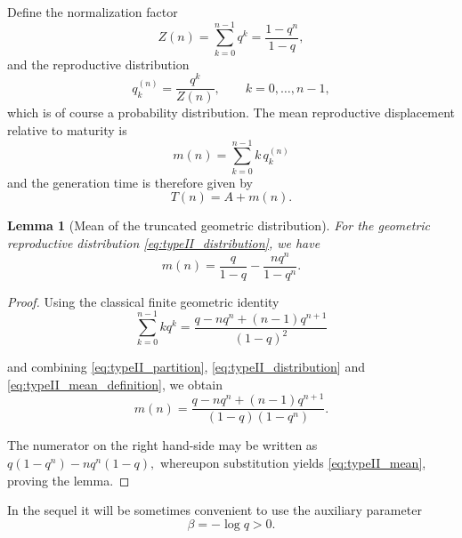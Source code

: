 \documentclass[10pt,a4paper]{amsart}
\newtheorem{lem}[thm]{Lemma}
\theoremstyle{definition}
\theoremstyle{remark}
\numberwithin{equation}{section}
\begin{document}
Define the normalization factor
\begin{equation}
Z(n)
=
\sum_{k=0}^{n-1}
q^k
=
\frac{
1-q^n
}{
1-q
},
\label{eq:typeII_partition}
\end{equation}
and the reproductive distribution
\begin{equation}
q_k^{(n)}
=
\frac{
q^k
}{
Z(n)
},
\qquad
k=0,\ldots,n-1,
\label{eq:typeII_distribution}
\end{equation}
which is of course a probability distribution.
The mean reproductive displacement relative to maturity is 
\begin{equation}
m(n)
=
\sum_{k=0}^{n-1}
k\,q_k^{(n)}
\label{eq:typeII_mean_definition}
\end{equation}
and the generation time is therefore given by
\begin{equation}
T(n)
=
A+m(n).
\label{eq:typeII_generation_time}
\end{equation}

\begin{lem}[Mean of the truncated geometric distribution]
For the geometric reproductive distribution
\eqref{eq:typeII_distribution}, we have
\begin{equation}
m(n)
=
\frac{q}{1-q}
-
\frac{nq^n}{
1-q^n}.
\label{eq:typeII_mean}
\end{equation}
\end{lem}

\begin{proof}
Using the classical finite geometric identity
\begin{equation}
\sum_{k=0}^{n-1}kq^k
=
\frac{q-nq^n+(n-1)q^{n+1}}
{(1-q)^2}
\label{eq:typeII_geometric_sum}
\end{equation}

\noindent and combining
\eqref{eq:typeII_partition},
\eqref{eq:typeII_distribution}
and
\eqref{eq:typeII_mean_definition},
we obtain
\begin{equation}
m(n)
=
\frac{
q-nq^n+(n-1)q^{n+1}
}{
(1-q)(1-q^n)
}.
\label{eq:typeII_mean_intermediate}
\end{equation}

\noindent The numerator on the right hand-side 
may be written as
$
q(1-q^n)-nq^n(1-q),
$
whereupon substitution 
yields
\eqref{eq:typeII_mean}, proving the lemma.
\end{proof}

In the sequel it will be sometimes convenient to use the auxiliary parameter
\begin{equation}
\beta=-\log q>0.
\label{eq:typeII_beta}
\end{equation}
\end{document}
